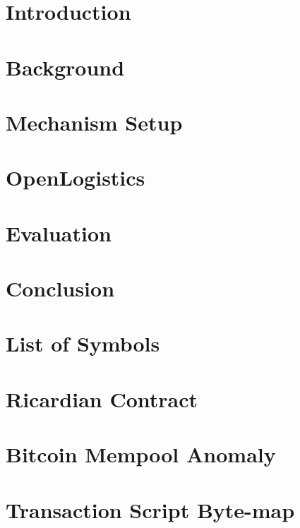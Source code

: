 \documentclass[Nomencl]{DylanMaster}
\begin{document}
\mytitlepage



\newpage
\thispagestyle{empty}
\tableofcontents

\newpage
\clearpage
\setcounter{page}{1}
\section{Introduction}


\newpage
\section{Background}


\newpage
\section{Mechanism Setup}


\newpage
\section{OpenLogistics}


\newpage
\section{Evaluation}


\newpage
\section{Conclusion}


\newpage
\appendix
\section{List of Symbols}


\newpage
\section{Ricardian Contract}


\newpage
\section{Bitcoin Mempool Anomaly}


\newpage
\section{Transaction Script Byte-map}


\newpage


\end{document}

